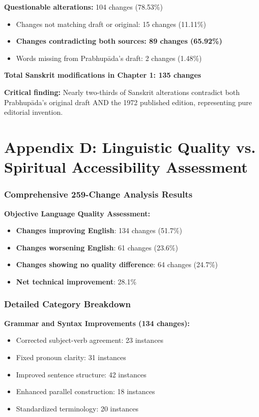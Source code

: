 \documentclass[11pt,twoside]{book}
\begin{document}
\textbf{\textbf{Questionable alterations:}} 104 changes (78.53\%)  
\begin{itemize}
\item Changes not matching draft or original: 15 changes (11.11\%)
\item \textbf{\textbf{Changes contradicting both sources: 89 changes (65.92\%)}}
\item Words missing from Prabhupāda's draft: 2 changes (1.48\%)
\end{itemize}

\textbf{\textbf{Total Sanskrit modifications in Chapter 1: 135 changes}}

\textbf{\textbf{Critical finding:}} Nearly two-thirds of Sanskrit alterations contradict both Prabhupāda's original draft AND the 1972 published edition, representing pure editorial invention.
\part*{Appendix D: Linguistic Quality vs. Spiritual Accessibility Assessment}
\label{sec:orgc760fd8}
\thispagestyle{plain}
\section*{Comprehensive 259-Change Analysis Results}
\label{sec:org629f005}

\textbf{\textbf{Objective Language Quality Assessment:}}
\begin{itemize}
\item \textbf{\textbf{Changes improving English}}: 134 changes (51.7\%)
\item \textbf{\textbf{Changes worsening English}}: 61 changes (23.6\%)
\item \textbf{\textbf{Changes showing no quality difference}}: 64 changes (24.7\%)
\item \textbf{\textbf{Net technical improvement}}: 28.1\%
\end{itemize}
\section*{Detailed Category Breakdown}
\label{sec:orga210644}

\textbf{\textbf{Grammar and Syntax Improvements (134 changes):}}
\begin{itemize}
\item Corrected subject-verb agreement: 23 instances
\item Fixed pronoun clarity: 31 instances
\item Improved sentence structure: 42 instances
\item Enhanced parallel construction: 18 instances
\item Standardized terminology: 20 instances
\end{itemize}
\end{document}
